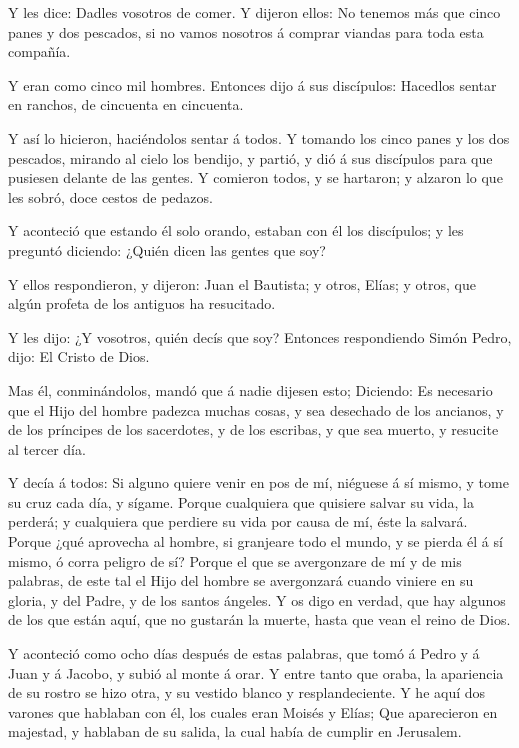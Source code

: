  Y les dice: Dadles vosotros de comer. Y dijeron ellos: No
tenemos más que cinco panes y dos pescados, si no vamos nosotros á
comprar viandas para toda esta compañía.

 Y eran como cinco mil hombres. Entonces dijo á sus
discípulos: Hacedlos sentar en ranchos, de cincuenta en cincuenta.

 Y así lo hicieron, haciéndolos sentar á todos.
 Y tomando los cinco panes y los dos pescados, mirando al
cielo los bendijo, y partió, y dió á sus discípulos para que pusiesen
delante de las gentes.  Y comieron todos, y se hartaron; y
alzaron lo que les sobró, doce cestos de pedazos.

 Y aconteció que estando él solo orando, estaban con él los
discípulos; y les preguntó diciendo: ¿Quién dicen las gentes que soy?

 Y ellos respondieron, y dijeron: Juan el Bautista; y
otros, Elías; y otros, que algún profeta de los antiguos ha resucitado.

 Y les dijo: ¿Y vosotros, quién decís que soy? Entonces
respondiendo Simón Pedro, dijo: El Cristo de Dios.

 Mas él, conminándolos, mandó que á nadie dijesen esto;
 Diciendo: Es necesario que el Hijo del hombre padezca
muchas cosas, y sea desechado de los ancianos, y de los príncipes de los
sacerdotes, y de los escribas, y que sea muerto, y resucite al tercer
día.

 Y decía á todos: Si alguno quiere venir en pos de mí,
niéguese á sí mismo, y tome su cruz cada día, y sígame. 
Porque cualquiera que quisiere salvar su vida, la perderá; y cualquiera
que perdiere su vida por causa de mí, éste la salvará. 
Porque ¿qué aprovecha al hombre, si granjeare todo el mundo, y se pierda
él á sí mismo, ó corra peligro de sí?  Porque el que se
avergonzare de mí y de mis palabras, de este tal el Hijo del hombre se
avergonzará cuando viniere en su gloria, y del Padre, y de los santos
ángeles.  Y os digo en verdad, que hay algunos de los que
están aquí, que no gustarán la muerte, hasta que vean el reino de Dios.

 Y aconteció como ocho días después de estas palabras, que
tomó á Pedro y á Juan y á Jacobo, y subió al monte á orar. 
Y entre tanto que oraba, la apariencia de su rostro se hizo otra, y su
vestido blanco y resplandeciente.  Y he aquí dos varones
que hablaban con él, los cuales eran Moisés y Elías;  Que
aparecieron en majestad, y hablaban de su salida, la cual había de
cumplir en Jerusalem.

